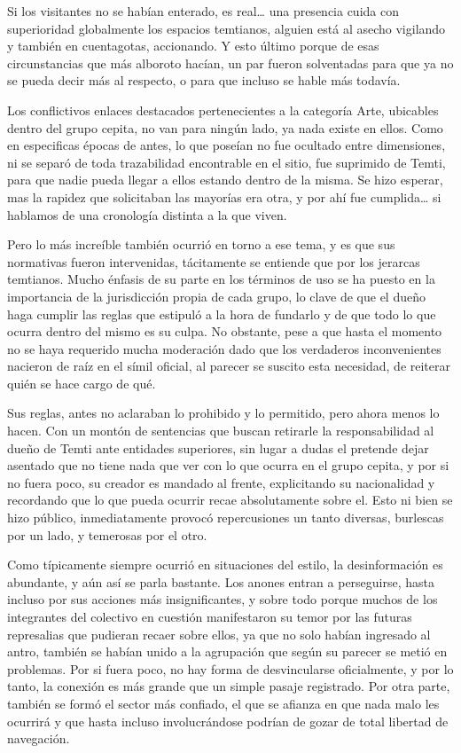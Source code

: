 \documentclass[
  spanish,
]{book}
\begin{document}
Si los visitantes no se habían enterado, es real\ldots{} una presencia cuida con superioridad globalmente los espacios temtianos, alguien está al asecho vigilando y también en cuentagotas, accionando. Y esto último porque de esas circunstancias que más alboroto hacían, un par fueron solventadas para que ya no se pueda decir más al respecto, o para que incluso se hable más todavía.

Los conflictivos enlaces destacados pertenecientes a la categoría Arte, ubicables dentro del grupo cepita, no van para ningún lado, ya nada existe en ellos. Como en especificas épocas de antes, lo que poseían no fue ocultado entre dimensiones, ni se separó de toda trazabilidad encontrable en el sitio, fue suprimido de Temti, para que nadie pueda llegar a ellos estando dentro de la misma. Se hizo esperar, mas la rapidez que solicitaban las mayorías era otra, y por ahí fue cumplida\ldots{} si hablamos de una cronología distinta a la que viven.

Pero lo más increíble también ocurrió en torno a ese tema, y es que sus normativas fueron intervenidas, tácitamente se entiende que por los jerarcas temtianos. Mucho énfasis de su parte en los términos de uso se ha puesto en la importancia de la jurisdicción propia de cada grupo, lo clave de que el dueño haga cumplir las reglas que estipuló a la hora de fundarlo y de que todo lo que ocurra dentro del mismo es su culpa. No obstante, pese a que hasta el momento no se haya requerido mucha moderación dado que los verdaderos inconvenientes nacieron de raíz en el símil oficial, al parecer se suscito esta necesidad, de reiterar quién se hace cargo de qué.

Sus reglas, antes no aclaraban lo prohibido y lo permitido, pero ahora menos lo hacen. Con un montón de sentencias que buscan retirarle la responsabilidad al dueño de Temti ante entidades superiores, sin lugar a dudas el pretende dejar asentado que no tiene nada que ver con lo que ocurra en el grupo cepita, y por si no fuera poco, su creador es mandado al frente, explicitando su nacionalidad y recordando que lo que pueda ocurrir recae absolutamente sobre el. Esto ni bien se hizo público, inmediatamente provocó repercusiones un tanto diversas, burlescas por un lado, y temerosas por el otro.

Como típicamente siempre ocurrió en situaciones del estilo, la desinformación es abundante, y aún así se parla bastante. Los anones entran a perseguirse, hasta incluso por sus acciones más insignificantes, y sobre todo porque muchos de los integrantes del colectivo en cuestión manifestaron su temor por las futuras represalias que pudieran recaer sobre ellos, ya que no solo habían ingresado al antro, también se habían unido a la agrupación que según su parecer se metió en problemas. Por si fuera poco, no hay forma de desvincularse oficialmente, y por lo tanto, la conexión es más grande que un simple pasaje registrado. Por otra parte, también se formó el sector más confiado, el que se afianza en que nada malo les ocurrirá y que hasta incluso involucrándose podrían de gozar de total libertad de navegación.
\end{document}
